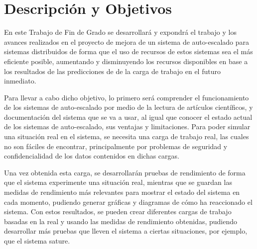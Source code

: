 







\chapter*{Descripción y Objetivos}
En este Trabajo de Fin de Grado se desarrollará y expondrá el trabajo y los avances realizados en el proyecto de mejora de un sistema de auto-escalado para sistemas distribuidos de forma que el uso de recursos de estos sistemas sea el más eficiente posible, aumentando y disminuyendo los recursos disponibles en base a los resultados de las predicciones de de la carga de trabajo en el futuro inmediato.

Para llevar a cabo dicho objetivo, lo primero será comprender el funcionamiento de los sistemas de auto-escalado por medio de la lectura de artículos científicos, y documentación del sistema que se va a usar, al igual que conocer el estado actual de los sistemas de auto-escalado, sus ventajas y limitaciones. Para poder simular una situación real en el sistema, se necesita una carga de trabajo real, las cuales no son fáciles de encontrar, principalmente por problemas de seguridad y confidencialidad de los datos contenidos en dichas cargas.

Una vez obtenida esta carga, se desarrollarán pruebas de rendimiento de forma que el sistema experimente una situación real, mientras que se guardan las medidas de rendimiento más relevantes para mostrar el estado del sistema en cada momento, pudiendo generar gráficas y diagramas de cómo ha reaccionado el sistema. Con estos resultados, se pueden crear diferentes cargas de trabajo basadas en la real y usando las medidas de rendimiento obtenidas, pudiendo desarrollar más pruebas que lleven el sistema a ciertas situaciones, por ejemplo, que el sistema sature.

